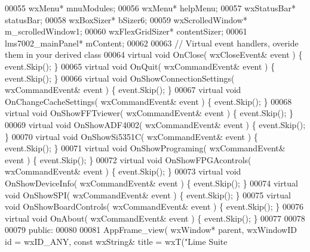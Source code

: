 \begin{DoxyCode}
00055         wxMenu* mnuModules;
00056         wxMenu* helpMenu;
00057         wxStatusBar* statusBar;
00058         wxBoxSizer* bSizer6;
00059         wxScrolledWindow* m_scrolledWindow1;
00060         wxFlexGridSizer* contentSizer;
00061         lms7002_mainPanel* mContent;
00062         
00063         \textcolor{comment}{// Virtual event handlers, overide them in your derived class}
00064         \textcolor{keyword}{virtual} \textcolor{keywordtype}{void} OnClose( wxCloseEvent& event ) \{ \textcolor{keyword}{event}.Skip(); \}
00065         \textcolor{keyword}{virtual} \textcolor{keywordtype}{void} OnQuit( wxCommandEvent& event ) \{ \textcolor{keyword}{event}.Skip(); \}
00066         \textcolor{keyword}{virtual} \textcolor{keywordtype}{void} OnShowConnectionSettings( wxCommandEvent& event ) \{ \textcolor{keyword}{event}.Skip(); \}
00067         \textcolor{keyword}{virtual} \textcolor{keywordtype}{void} OnChangeCacheSettings( wxCommandEvent& event ) \{ \textcolor{keyword}{event}.Skip(); \}
00068         \textcolor{keyword}{virtual} \textcolor{keywordtype}{void} OnShowFFTviewer( wxCommandEvent& event ) \{ \textcolor{keyword}{event}.Skip(); \}
00069         \textcolor{keyword}{virtual} \textcolor{keywordtype}{void} OnShowADF4002( wxCommandEvent& event ) \{ \textcolor{keyword}{event}.Skip(); \}
00070         \textcolor{keyword}{virtual} \textcolor{keywordtype}{void} OnShowSi5351C( wxCommandEvent& event ) \{ \textcolor{keyword}{event}.Skip(); \}
00071         \textcolor{keyword}{virtual} \textcolor{keywordtype}{void} OnShowPrograming( wxCommandEvent& event ) \{ \textcolor{keyword}{event}.Skip(); \}
00072         \textcolor{keyword}{virtual} \textcolor{keywordtype}{void} OnShowFPGAcontrols( wxCommandEvent& event ) \{ \textcolor{keyword}{event}.Skip(); \}
00073         \textcolor{keyword}{virtual} \textcolor{keywordtype}{void} OnShowDeviceInfo( wxCommandEvent& event ) \{ \textcolor{keyword}{event}.Skip(); \}
00074         \textcolor{keyword}{virtual} \textcolor{keywordtype}{void} OnShowSPI( wxCommandEvent& event ) \{ \textcolor{keyword}{event}.Skip(); \}
00075         \textcolor{keyword}{virtual} \textcolor{keywordtype}{void} OnShowBoardControls( wxCommandEvent& event ) \{ \textcolor{keyword}{event}.Skip(); \}
00076         \textcolor{keyword}{virtual} \textcolor{keywordtype}{void} OnAbout( wxCommandEvent& event ) \{ \textcolor{keyword}{event}.Skip(); \}
00077         
00078     
00079     \textcolor{keyword}{public}:
00080         
00081         AppFrame_view( wxWindow* parent, wxWindowID \textcolor{keywordtype}{id} = wxID\_ANY, \textcolor{keyword}{const} wxString& title = wxT(\textcolor{stringliteral}{"Lime Suite
}
\end{DoxyCode}
